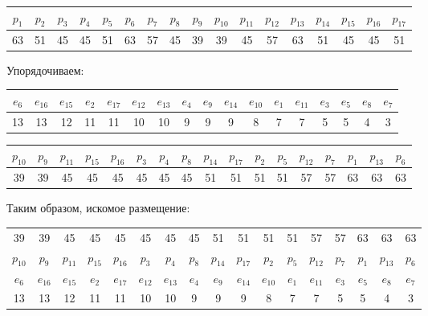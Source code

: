 \documentclass[12pt, a4paper] {ncc}
\begin{document}
\begin{center}
\begin{longtable}{|c c c c c c c c c c c c c c c c c|}
\hline
$p_{1}$ & $p_{2}$ & $p_{3}$ & $p_{4}$ & $p_{5}$ & $p_{6}$ & $p_{7}$ & $p_{8}$ & $p_{9}$ & $p_{10}$& $p_{11}$& $p_{12}$& $p_{13}$& $p_{14}$& $p_{15}$& $p_{16}$& $p_{17}$ \\
\hline
63 & 51 & 45 & 45 & 51 & 63 & 57 & 45 & 39 & 39 & 45 & 57 & 63 & 51 & 45 & 45 & 51 \\
\hline
\end{longtable}
\end{center}

Упорядочиваем:

\begin{center}
\begin{longtable}{|c c c c c c c c c c c c c c c c c|}
\hline
$e_{6}$ & $e_{16}$  & $e_{15}$  & $e_{2}$  & $e_{17}$ & $e_{12}$  & $e_{13}$ & $e_{4}$ & $e_{9}$  & $e_{14}$ & $e_{10}$ & $e_{1}$ & $e_{11}$  & $e_{3}$ & $e_{5}$  & $e_{8}$  & $e_{7}$ \\
\hline
13 & 13 & 12 & 11 & 11 & 10 & 10 & 9 & 9 & 9 & 8 & 7 & 7 & 5 & 5 & 4 & 3 \\ \hline
\end{longtable}
\end{center}

\begin{longtable}{|c c c c c c c c c c c c c c c c c|}
\hline
$p_{10}$   & $p_{9}$  & $p_{11}$   & $p_{15}$  & $p_{16}$   & $p_{3}$   & $p_{4}$   & $p_{8}$  & $p_{14}$  & $p_{17}$  & $p_{2}$   & $p_{5}$   & $p_{12}$   & $p_{7}$   & $p_{1}$  & $p_{13}$  & $p_{6}$  \\
\hline
39 & 39 & 45 & 45 & 45 & 45 & 45 & 45 & 51 & 51 & 51 & 51 & 57 & 57 & 63 & 63 & 63 \\
\hline
\end{longtable}

Таким образом, искомое размещение:

\begin{longtable}{|c|c|c|c|c|c|c|c|c|c|c|c|c|c|c|c|c|}
\hline
39 & 39 & 45 & 45 & 45 & 45 & 45 & 45 & 51 & 51 & 51 & 51 & 57 & 57 & 63 & 63 & 63 \\
$p_{10}$ & $p_{9}$  & $p_{11}$ & $p_{15}$ & $p_{16}$ & $p_{3}$  & $p_{4}$  & $p_{8}$ & $p_{14}$ & $p_{17}$ & $p_{2}$  & $p_{5}$ & $p_{12}$ & $p_{7}$  & $p_{1}$ & $p_{13}$ & $p_{6}$ \\
$e_{6}$  & $e_{16}$ & $e_{15}$ & $e_{2}$  & $e_{17}$ & $e_{12}$ & $e_{13}$ & $e_{4}$ & $e_{9}$  & $e_{14}$ & $e_{10}$ & $e_{1}$ & $e_{11}$  & $e_{3}$ & $e_{5}$ & $e_{8}$  & $e_{7}$ \\
13 & 13 & 12 & 11 & 11 & 10 & 10 & 9 & 9 & 9 & 8 & 7 & 7 & 5 & 5 & 4 & 3 \\ 
\hline
\end{longtable}
\end{document}
